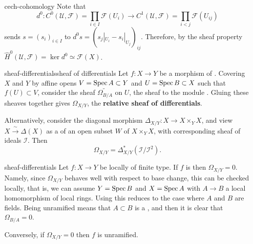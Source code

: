 \begin{example}{cech-cohomology}
    Note that 
    \[ d^0 : C^0(\mathcal{U}, \mathcal{F}) = \prod_{i \in I} \mathcal{F}(U_i) \to C^1(\mathcal{U}, \mathcal{F}) = \prod_{i < j} \mathcal{F}(U_{ij}) \]
    sends $s = (s_i)_{i \in I}$ to $d^0 s = \left(s_j|_{U_i} - s_i|_{U_j}\right)_{ij}$. Therefore, by the sheaf property $\hat{H}^0(\mathcal{U}, \mathcal{F}) = \ker d^0 \simeq \mathcal{F}(X)$.
\end{example}

\begin{topic}{sheaf-differentials}{sheaf of differentials}
    Let $f : X \to Y$ be a morphism of . Covering $X$ and $Y$ by affine opens $V = \operatorname{Spec} A \subset Y$ and $U = \operatorname{Spec} B \subset X$ such that $f(U) \subset V$, consider the sheaf $\widetilde{\Omega_{B/A}}$ on $U$, the sheaf  to the module . Gluing these sheaves together gives $\Omega_{X/Y}$, the \textbf{relative sheaf of differentials}.
    
    Alternatively, consider the diagonal morphism $\Delta_{X/Y} : X \to X \times_Y X$, and view $X \xrightarrow{\sim{}} \Delta(X)$ as a  of an open subset $W$ of $X \times_Y X$, with corresponding sheaf of ideals $\mathcal{I}$. Then
    \[ \Omega_{X/Y} = \Delta_{X/Y}^*(\mathcal{I}/\mathcal{I}^2) . \]
\end{topic}

\begin{example}{sheaf-differentials}
    Let $f : X \to Y$ be locally of finite type. If $f$ is  then $\Omega_{X/Y} = 0$. Namely, since $\Omega_{X/Y}$ behaves well with respect to base change, this can be checked locally, that is, we can assume $Y = \operatorname{Spec} B$ and $X = \operatorname{Spec} A$ with $A \to B$ a local homomorphism of local rings. Using  this reduces to the case where $A$ and $B$ are fields. Being unramified means that $A \subset B$ is a , and then it is clear that $\Omega_{B/A} = 0$.
    
    Conversely, if $\Omega_{X/Y} = 0$ then $f$ is unramified.
\end{example}


